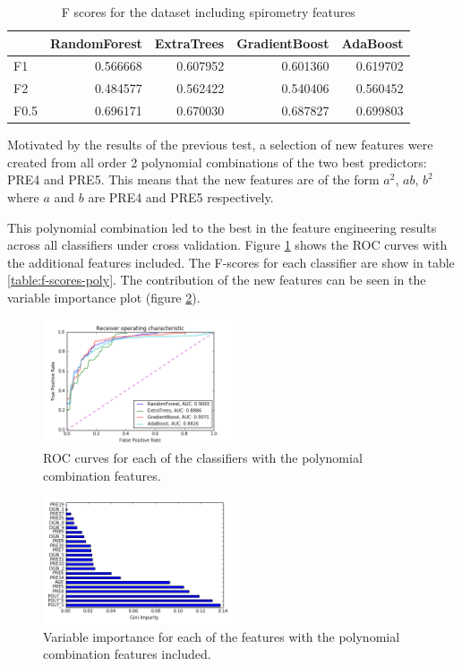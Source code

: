 \documentclass[journal]{IEEEtran}
\begin{document}
\begin{table}
\caption{F scores for the dataset including spirometry features}
\begin{tabular}{lrrrr}
{} &  RandomForest &  ExtraTrees &  GradientBoost &  AdaBoost \\
\hline
F1   &      0.566668 &    0.607952 &       0.601360 &  0.619702 \\
F2   &      0.484577 &    0.562422 &       0.540406 &  0.560452 \\
F0.5 &      0.696171 &    0.670030 &       0.687827 &  0.699803 \\
\end{tabular}
\label{table:f-scores-spiro}
\end{table}

Motivated by the results of the previous test, a selection of new features were created from all order 2 polynomial combinations of the two best predictors: PRE4 and PRE5. This means that the new features are of the form $a^2$, $ab$, $b^2$ where $a$ and $b$ are PRE4 and PRE5 respectively. 

This polynomial combination led to the best in the feature engineering results across all classifiers under cross validation. Figure \ref{fig:roc-poly-features} shows the ROC curves with the additional features included. The F-scores for each classifier are show in table \ref{table:f-scores-poly}. The contribution of the new features can be seen in the variable importance plot (figure \ref{fig:importance-poly-features}).

\begin{figure}[!t]
\centering
\includegraphics[width=0.5\textwidth]{../src/img/roc_poly_features.png}
\caption{ROC curves for each of the classifiers with the polynomial combination features.}
\label{fig:roc-poly-features}
\end{figure}

\begin{figure}[!t]
\centering
\includegraphics[width=0.5\textwidth]{../src/img/importance_poly_features.png}
\caption{Variable importance for each of the features with the polynomial combination features included.}
\label{fig:importance-poly-features}
\end{figure}
\end{document}
